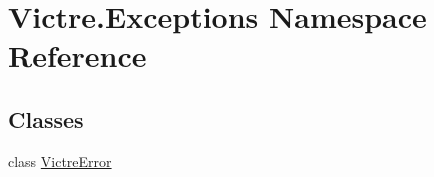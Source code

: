 \hypertarget{namespaceVictre_1_1Exceptions}{\section{Victre.\-Exceptions Namespace Reference}
\label{namespaceVictre_1_1Exceptions}
}
\subsection*{Classes}
\begin{DoxyCompactItemize}
\item 
class \hyperlink{classVictre_1_1Exceptions_1_1VictreError}{Victre\-Error}
\end{DoxyCompactItemize}
